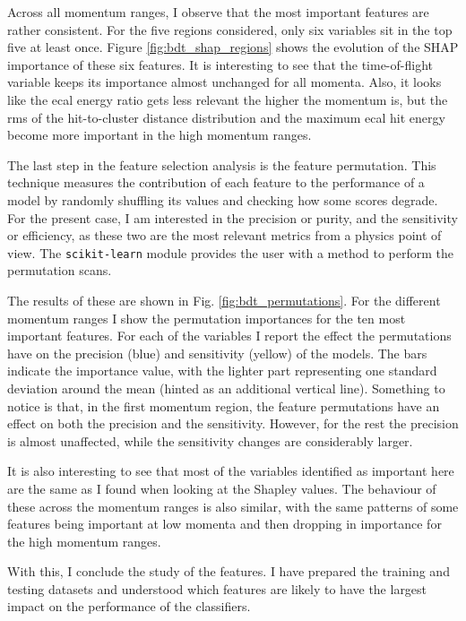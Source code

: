 Across all momentum ranges, I observe that the most important features are rather consistent. For the five regions considered, only six variables sit in the top five at least once. Figure \ref{fig:bdt_shap_regions} shows the evolution of the SHAP importance of these six features. It is interesting to see that the time-of-flight variable keeps its importance almost unchanged for all momenta. Also, it looks like the \gls{ecal} energy ratio gets less relevant the higher the momentum is, but the \gls{rms} of the hit-to-cluster distance distribution and the maximum \gls{ecal} hit energy become more important in the high momentum ranges.

The last step in the feature selection analysis is the feature permutation. This technique measures the contribution of each feature to the performance of a model by randomly shuffling its values and checking how some scores degrade. For the present case, I am interested in the precision or purity, and the sensitivity or efficiency, as these two are the most relevant metrics from a physics point of view. The \texttt{scikit-learn} module provides the user with a method to perform the permutation scans.

The results of these are shown in Fig. \ref{fig:bdt_permutations}. For the different momentum ranges I show the permutation importances for the ten most important features. For each of the variables I report the effect the permutations have on the precision (blue) and sensitivity (yellow) of the models. The bars indicate the importance value, with the lighter part representing one standard deviation around the mean (hinted as an additional vertical line). Something to notice is that, in the first momentum region, the feature permutations have an effect on both the precision and the sensitivity. However, for the rest the precision is almost unaffected, while the sensitivity changes are considerably larger.

It is also interesting to see that most of the variables identified as important here are the same as I found when looking at the Shapley values. The behaviour of these across the momentum ranges is also similar, with the same patterns of some features being important at low momenta and then dropping in importance for the high momentum ranges.

With this, I conclude the study of the features. I have prepared the training and testing datasets and understood which features are likely to have the largest impact on the performance of the classifiers.

